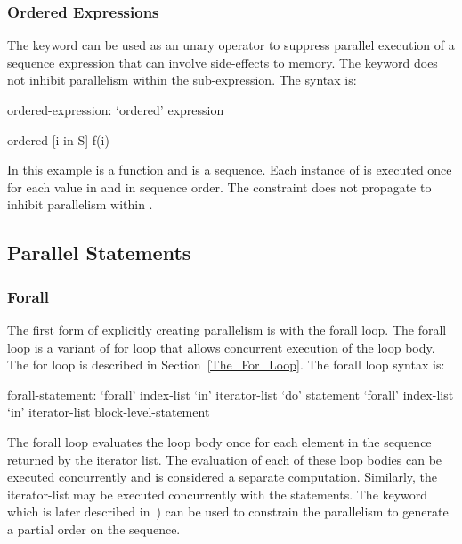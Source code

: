\subsubsection{Ordered Expressions}
\label{Ordered_Expressions}

The  keyword can be used as an unary operator to
suppress parallel execution of a sequence expression that can involve
side-effects to memory. The  keyword does not inhibit
parallelism within the sub-expression. The syntax is:
\begin{syntax}
ordered-expression:
   `ordered' expression
\end{syntax}

\begin{example}
\begin{chapel}
ordered [i in S] f(i) 
\end{chapel}
In this example  is a function and  is a
sequence. Each instance of  is executed once for each value
in  and in sequence order. The  constraint does
not propagate to inhibit parallelism within .
\end{example}

\subsection{Parallel Statements}
\label{Parallel_Statements}



\subsubsection{Forall}
\label{Forall}

The first form of explicitly creating parallelism is with the forall
loop. The forall loop is a variant of for loop that allows concurrent
execution of the loop body. The for loop is described in
Section~\ref{The_For_Loop}. The forall loop syntax is:
\begin{syntax}
forall-statement:
   `forall' index-list `in' iterator-list `do' statement
   `forall' index-list `in' iterator-list block-level-statement
\end{syntax}

The forall loop evaluates the loop body once for each element in the
sequence returned by the iterator list. The evaluation of each of
these loop bodies can be executed concurrently and is considered a
separate computation. Similarly, the iterator-list may be executed
concurrently with the statements. The keyword  which is
later described in~) can be used to constrain
the parallelism to generate a partial order on the sequence.

